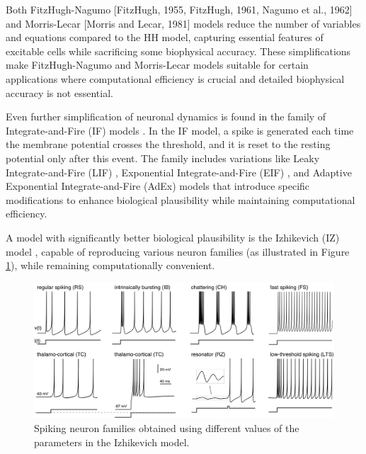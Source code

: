 Both FitzHugh-Nagumo [FitzHugh, 1955, FitzHugh, 1961, Nagumo et al., 1962] and Morris-Lecar [Morris and Lecar, 1981] models reduce the number of variables and equations compared to the HH model, capturing essential features of excitable cells while sacrificing some biophysical accuracy. These simplifications make FitzHugh-Nagumo and Morris-Lecar models suitable for certain applications where computational efficiency is crucial and detailed biophysical accuracy is not essential. 

Even further simplification of neuronal dynamics is found in the family of Integrate-and-Fire (IF) models  \cite{Abbott1999}. In the IF model, a spike is generated each time the membrane potential crosses the threshold, and it is reset to the resting potential only after this event. The family includes variations like Leaky Integrate-and-Fire (LIF) \cite{GerstnerKistler2002}, Exponential Integrate-and-Fire (EIF) \cite{Fourcaud-Trocmé2003}, and Adaptive Exponential Integrate-and-Fire (AdEx) \cite{GerstnerBrette2009} models that introduce specific modifications to enhance biological plausibility while maintaining computational efficiency.

A model with significantly better biological plausibility is the Izhikevich (IZ) model \cite{Izhikevich2003}, capable of reproducing various neuron families (as illustrated in Figure \ref{fig:Izhikevich Spiking Neuron Families}), while remaining computationally convenient.

\begin{figure}[ht!]
    \begin{center}
    \includegraphics[width=0.9\linewidth]{Figure/Izhikevich Spiking Neuron Families.jpg}
    \end{center}
    \caption{\protect\cite{Izhikevich2003} Spiking neuron families obtained using different values of the parameters in the Izhikevich model.}
    \label{fig:Izhikevich Spiking Neuron Families}
\end{figure}

